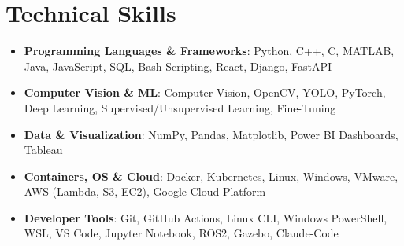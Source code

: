 \documentclass[letterpaper,11pt]{article}
\makeatletter
\newcommand{\resumeItem}[1]{\item\small{#1 \vspace{-4pt}}}
\newcommand{\resumeSubheading}[4]{
    \vspace{-2pt}\item
    \begin{tabular*}{1.0\textwidth}[t]{l@{\extracolsep{\fill}}r}
        \textbf{#1} & \textbf{\small #2} \\
        \textit{\small#3} & \textit{\small #4}
    \end{tabular*}\vspace{-7pt}
}
\newcommand{\resumeSubItem}[1]{\resumeItem{#1}\vspace{-4pt}}
\newcommand{\resumeSubHeadingListStart}{\begin{itemize}[leftmargin=0.0in, label={}]}
\newcommand{\resumeSubHeadingListEnd}{\end{itemize}}
\newcommand{\resumeItemListStart}{\begin{itemize}}
\newcommand{\resumeItemListEnd}{\end{itemize}\vspace{-7pt}}
\makeatother
\begin{document}




\vspace{-0.4cm}
\vspace{3pt}
\section{Technical Skills}
\resumeSubHeadingListStart
\resumeSubItem{\textbf{Programming Languages \& Frameworks}{: Python, C++, C, MATLAB, Java, JavaScript, SQL, Bash Scripting, React, Django, FastAPI}}
\vspace{4pt}
\resumeSubItem{\textbf{Computer Vision \& ML}{: Computer Vision, OpenCV, YOLO, PyTorch, Deep Learning, Supervised/Unsupervised Learning, Fine-Tuning}}
\vspace{4pt}
\resumeSubItem{\textbf{Data \& Visualization}{: NumPy, Pandas, Matplotlib, Power BI Dashboards, Tableau}}
\vspace{4pt}
\resumeSubItem{\textbf{Containers, OS \& Cloud}{: Docker, Kubernetes, Linux, Windows, VMware, AWS (Lambda, S3, EC2), Google Cloud Platform}}
\vspace{4pt}
\resumeSubItem{\textbf{Developer Tools}{: Git, GitHub Actions, Linux CLI, Windows PowerShell, WSL, VS Code, Jupyter Notebook, ROS2, Gazebo, Claude-Code}}
\resumeSubHeadingListEnd
\end{document}

